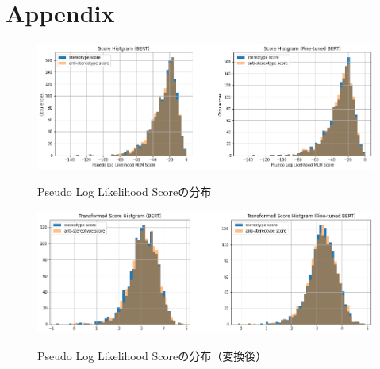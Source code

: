 \documentclass[
  platex, dvipdfmx %
]{nlp2021}
\begin{document}
\clearpage






\clearpage
\appendix
\onecolumn
\section{Appendix}

\begin{figure}[h]
\centering
\caption{Pseudo Log Likelihood Scoreの分布}
\includegraphics[width=15cm]{hist_pseudo_log_likelihood.png}
\label{fig:hist_log_likelihoods}
\end{figure}

\begin{figure}[h]
\centering
\caption{Pseudo Log Likelihood Scoreの分布（変換後）}
\includegraphics[width=15cm]{hist_transformed_pseudo_log_likelihood.png}
\label{fig:hist_transformed_log_likelihoods}
\end{figure}
\end{document}
